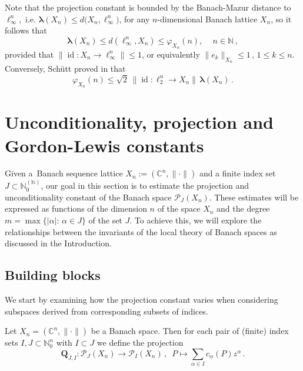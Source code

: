 \documentclass[12pt]{amsart}
\numberwithin{subsection}{section}
\theoremstyle{definition}
\theoremstyle{remark}
\DeclareMathOperator{\id}{\mathrm{id}}
\begin{document}
Note that the projection constant is bounded by the Banach-Mazur distance to $\ell_\infty^n,$ i.e. $\boldsymbol{\lambda}(X_n) \leq d\big(X_n, \ell_\infty^n \big)$,
for any $n$-dimensional Banach lattice $X_n$, so it follows that
\begin{equation} \label{Carsten1}
\boldsymbol{\lambda}(X_n) \leq d(\ell^n_\infty, X_n) \leq \varphi_{X_n}(n), \quad\, n\in \mathbb{N}\,,
\end{equation}
provided that $\|\id\colon X_n \to \ell_{\infty}^n\| \leq 1$, or equivalently  $\|e_k\|_{X_n}\leq 1\,, \, 1 \leq k \leq n$.
Conversely, Sch\"{u}tt proved in \cite{schutt1978projection} that
\begin{equation} \label{schuett}
\varphi_{X_n}(n) \leq \sqrt{2} \, \big\|\id\colon \ell_{2}^n \to  X_n\big\| \, \boldsymbol{\lambda}(X_n)\,.
\end{equation}


\section{Unconditionality, projection and Gordon-Lewis constants} \label{Unconditionality}

Given a~Banach sequence lattice $X_n:=(\mathbb{C}^n, \|\cdot\|)$ and a finite  index set $J \subset \mathbb{N}_0^{(\mathbb{N})}$,
our goal in this section is to estimate the projection and unconditionality constant of the Banach space $\mathcal{P}_{J}(X_n)$.
These estimates will be expressed as functions of the dimension $n$ of the space $X_n$  and the degree
$m = \max\{|\alpha|: \, \alpha \in J\}$ of the set $J$. To achieve this, we will explore the relationships between the invariants
of the local theory of Banach spaces as discussed in the Introduction.


\subsection{Building blocks}
We start by examining how the projection constant varies when considering subspaces derived from corresponding subsets of indices.

Let $X_n = (\mathbb C^n, \|\cdot\|)$ be a Banach space. Then for each pair of  (finite) index sets $I,J \subset  \mathbb{N}_0^n$
with $I \subset J$ we define the projection
\begin{equation} \label{anni}
\mathbf{Q}_{J,I}:\mathcal{P}_J(X_n) \to \mathcal{P}_I(X_n)\,,\,\,\,
P \mapsto \sum_{\alpha \in  I} c_\alpha(P) z^\alpha\,.
\end{equation}
\end{document}
